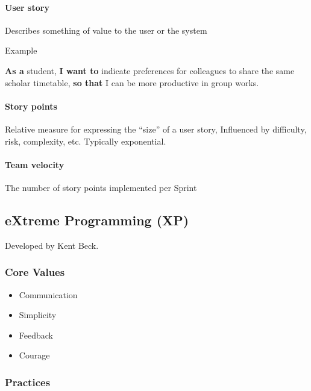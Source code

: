 \documentclass[../ESOF_notes.tex]{subfiles}
\begin{document}
\paragraph{User story}
Describes something of value to the user or the system

Example

\textbf{As a} student, \textbf{I want to} indicate preferences for colleagues to share
the same scholar timetable, \textbf{so that} I can be more productive in group works.

\paragraph{Story points}

Relative measure for expressing the “size” of a user story, Influenced by difficulty, risk, complexity, etc.
Typically exponential.

\paragraph{Team velocity}

The number of story points implemented per Sprint

\subsection{eXtreme Programming (XP)}

Developed by Kent Beck.

\subsubsection{Core Values}

\begin{itemize}
    \item Communication
    \item Simplicity
    \item Feedback
    \item Courage
\end{itemize}

\subsubsection{Practices}
\end{document}
